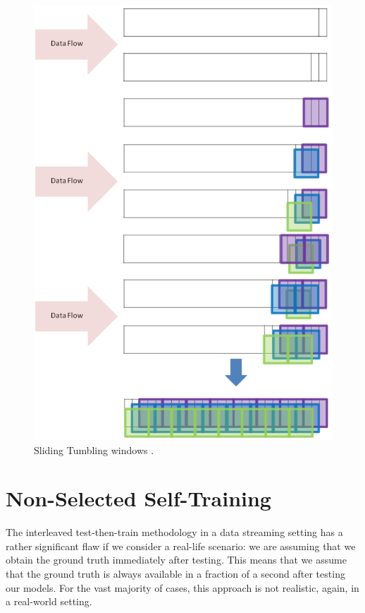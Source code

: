 \begin{figure}
  \includegraphics[width=\linewidth]{./images/chapter3/sliding_tumbling_windows}
  \caption{Sliding Tumbling windows \citep{d2016fine}.}
  \label{fig:sliding_tumbling_windows}
\end{figure}




\section{Non-Selected Self-Training \label{section:vc_reduce_gt}}

The interleaved test-then-train methodology in a data streaming setting has a rather significant flaw if we consider a real-life scenario: we are assuming that we obtain the ground truth immediately after testing. This means that we assume that the ground truth is always available in a fraction of a second after testing our models. For the vast majority of cases, this approach is not realistic, again, in a real-world setting.

